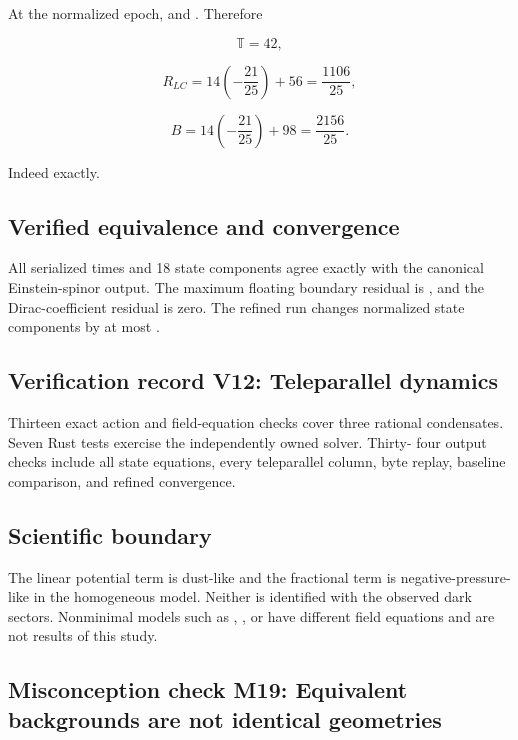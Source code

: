 \documentclass[11pt]{article}
\begin{document}
At the normalized epoch, \texttt{} and \texttt{}. Therefore

\[
\mathbb T=42,
\]

\[
R_{LC}=14\left(-\frac{21}{25}\right)+56=\frac{1106}{25},
\]

\[
B=14\left(-\frac{21}{25}\right)+98=\frac{2156}{25}.
\]

Indeed \texttt{} exactly.

\subsection{Verified equivalence and convergence}

All serialized times and 18 state components agree exactly with the canonical Einstein-spinor output. The maximum floating boundary residual is \texttt{}, and the Dirac-coefficient residual is zero. The refined run changes normalized state components by at most \texttt{}.

\subsection{Verification record V12: Teleparallel dynamics}

Thirteen exact action and field-equation checks cover three rational condensates. Seven Rust tests exercise the independently owned solver. Thirty- four output checks include all state equations, every teleparallel column, byte replay, baseline comparison, and refined convergence.

\subsection{Scientific boundary}

The linear potential term is dust-like and the fractional term is negative-pressure-like in the homogeneous model. Neither is identified with the observed dark sectors. Nonminimal models such as \texttt{}, \texttt{}, or \texttt{} have different field equations and are not results of this study.

\subsection{Misconception check M19: Equivalent backgrounds are not identical geometries}
\end{document}
